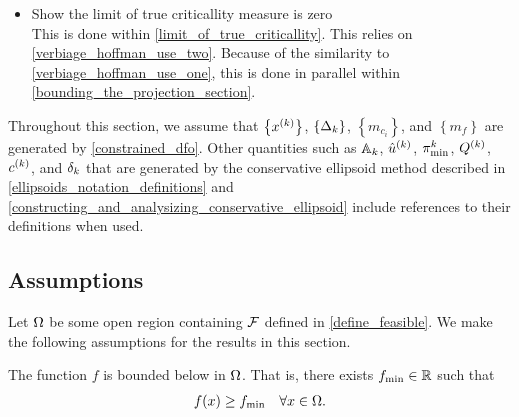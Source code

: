 \begin{itemize}
\item Show the limit of true criticallity measure is zero \\
This is done within \cref{limit_of_true_criticallity}.
This relies on \cref{verbiage_hoffman_use_two}.
Because of the similarity to \cref{verbiage_hoffman_use_one}, this is done in parallel within \cref{bounding_the_projection_section}.
\end{itemize}

Throughout this section, we assume that 
$\left\{x^{(k)}\right\}$,
$\left\{\Delta_k\right\}$,
$\left\{m_{c_i}\right\}$,
and
$\left\{m_{f}\right\}$
are generated by 
\cref{constrained_dfo}.
Other quantities such as ${\mathbb A_{k}}$, ${{\hat u}^{(k)}}$, ${\pi^k_{\textrm{min}}}$, ${Q^{(k)}}$, ${c^{(k)}}$, and $\delta_k$ 
that are generated by the conservative ellipsoid method described in
\cref{ellipsoids_notation_definitions} and \cref{constructing_and_analysizing_conservative_ellipsoid}
include references to their definitions when used.




\subsection{Assumptions}
Let $\Omega$ be some open region containing ${\mathcal F}$ defined in \cref{define_feasible}.
We make the following assumptions for the results in this section.



\begin{assumption}
\label{bounded_below_assumption}
The function $f$ is bounded below in $ \Omega $. That is, there exists $f_{\text{min}} \in \mathbb R$ such that
\begin{align*}
f(x) \ge f_{\text{min}} \quad  \forall x \in \Omega.
\end{align*}
\end{assumption}

